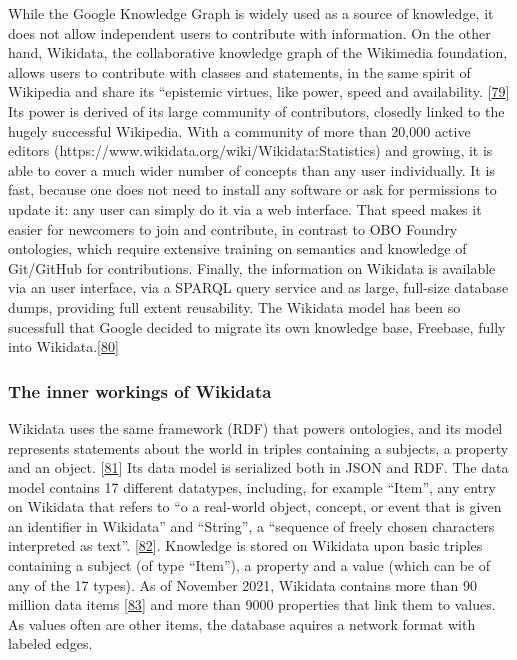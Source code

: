 While the Google Knowledge Graph is widely used as a source of knowledge, it does not allow independent users to contribute with information.
On the other hand, Wikidata, the collaborative knowledge graph of the Wikimedia foundation, allows users to contribute with classes and statements, in the same spirit of Wikipedia and share its ``epistemic virtues, like power, speed and availability. {[}\protect\hyperlink{ref-qMozvNth}{79}{]}
Its power is derived of its large community of contributors, closedly linked to the hugely successful Wikipedia.
With a community of more than 20,000 active editors (https://www.wikidata.org/wiki/Wikidata:Statistics) and growing, it is able to cover a much wider number of concepts than any user individually.
It is fast, because one does not need to install any software or ask for permissions to update it: any user can simply do it via a web interface.
That speed makes it easier for newcomers to join and contribute, in contrast to OBO Foundry ontologies, which require extensive training on semantics and knowledge of Git/GitHub for contributions.
Finally, the information on Wikidata is available via an user interface, via a SPARQL query service and as large, full-size database dumps, providing full extent reusability.
The Wikidata model has been so sucessfull that Google decided to migrate its own knowledge base, Freebase, fully into Wikidata.{[}\protect\hyperlink{ref-xLpRePoh}{80}{]}

\hypertarget{the-inner-workings-of-wikidata}{%
\subsubsection{The inner workings of Wikidata}\label{the-inner-workings-of-wikidata}}

Wikidata uses the same framework (RDF) that powers ontologies, and its model represents statements about the world in triples containing a subjects, a property and an object. {[}\protect\hyperlink{ref-Ea6hVYrD}{81}{]}
Its data model is serialized both in JSON and RDF.
The data model contains 17 different datatypes, including, for example ``Item'', any entry on Wikidata that refers to ``o a real-world object, concept, or event that is given an identifier in Wikidata'' and ``String'', a ``sequence of freely chosen characters interpreted as text''. {[}\protect\hyperlink{ref-17Yt10yrY}{82}{]}.
Knowledge is stored on Wikidata upon basic triples containing a subject (of type ``Item''), a property and a value (which can be of any of the 17 types).
As of November 2021, Wikidata contains more than 90 million data items {[}\protect\hyperlink{ref-SGzjBOG0}{83}{]} and more than 9000 properties that link them to values.
As values often are other items, the database aquires a network format with labeled edges.


